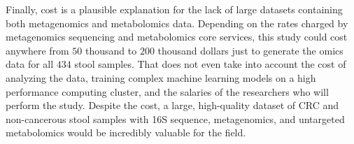 \documentclass[11pt]{article}
\begin{document}
Finally, cost is a plausible explanation for the lack of large datasets containing both metagenomics and metabolomics data.
Depending on the rates charged by metagenomics sequencing and metabolomics core services,
this study could cost anywhere from $50$ thousand to $200$ thousand dollars just to generate the omics data for all $434$ stool samples.
That does not even take into account the cost of analyzing the data, training complex machine learning models on a high performance computing cluster, and the salaries of the researchers who will perform the study.
Despite the cost, a large, high-quality dataset of CRC and non-cancerous stool samples with 16S sequence, metagenomics, and untargeted metabolomics would be incredibly valuable for the field.

\pagebreak
\footnotesize{

\par}
\end{document}
